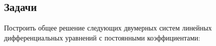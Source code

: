 \subsection{Задачи}

	Построить общее решение следующих двумерных систем линейных дифференциальных уравнений с постоянными коэффициентами:
	\begin{multicols}{4}
		\begin{enumtasks}
			
	

\end{enumtasks}
\end{multicols}
